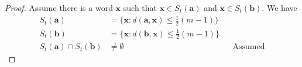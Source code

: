 \documentclass[twoside]{amsart}
\begin{document}
\begin{enumerate}[A.]
      \begin{proof}
         Assume there is a word $\mathbf{x}$ such that $\mathbf{x} \in
         S_t(\mathbf{a})$ and $\mathbf{x}\in S_t( \mathbf{b})$. 
         We have
         \begin{align*}
	 S_t(\mathbf{a}) & = \{\mathbf{x} : d(\mathbf{a},\mathbf{x}) 
	    \le \frac{1}{2}(m-1) \} \\
         S_t(\mathbf{b}) & = \{\mathbf{x} : d(\mathbf{b},\mathbf{x}) 
	    \le \frac{1}{2}(m-1) \} \\
	    S_t(\mathbf{a}) \cap S_t(\mathbf{b}) & \ne \emptyset 
	        && \text{Assumed}
         \end{align*}
      \end{proof}

\end{enumerate}
\end{document}

